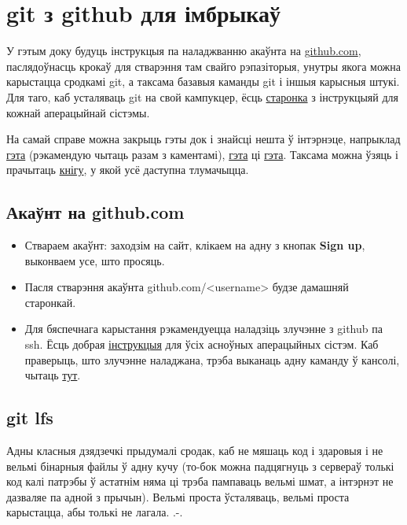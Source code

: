 \documentclass[12pt, a4paper]{extarticle}
\begin{document}
    \section{git з github для імбрыкаў}
    У гэтым доку будуць інструкцыя па наладжванню акаўнта на \href{https://github.com/}{github.com}, паслядоўнасць крокаў для стварэння там свайго рэпазіторыя, унутры якога можна карыстацца сродкамі git, а таксама базавыя каманды git і іншыя карысныя штукі. Для таго, каб усталяваць git на свой кампукцер, ёсць \href{https://git-scm.com/book/en/v2/Getting-Started-Installing-Git}{старонка} з інструкцыяй для кожнай аперацыйнай сістэмы.

    На самай справе можна закрыць гэты док і знайсці нешта ў інтэрнэце, напрыклад \href{https://habr.com/ru/post/125799/}{гэта} (рэкамендую чытаць разам з каментамі), \href{https://www.tutorialspoint.com/git/index.htm}{гэта} ці \href{https://githowto.com}{гэта}. Таксама можна ўзяць і прачытаць \href{https://git-scm.com/book/en/v1/}{кнігу}, у якой усё даступна тлумачыцца.

    \subsection{Акаўнт на github.com}
    \begin{itemize}    
        \item Ствараем акаўнт: заходзім на сайт, клікаем на адну з кнопак \textbf{Sign up}, выконваем усе, што просяць.
        \item Пасля стварэння акаўнта github.com/<username> будзе дамашняй старонкай.
        \item Для бяспечнага карыстання рэкамендуецца наладзіць злучэнне з github па ssh. Ёсць добрая \href{https://help.github.com/en/articles/generating-a-new-ssh-key-and-adding-it-to-the-ssh-agent}{інструкцыя} для ўсіх асноўных аперацыйных сістэм. Каб праверыць, што злучэнне наладжана, трэба выканаць адну каманду ў кансолі, чытаць \href{https://help.github.com/en/articles/testing-your-ssh-connection}{тут}.    
    \end{itemize}

    \subsection{git lfs}
    Адны класныя дзядзечкі прыдумалі сродак, каб не мяшаць код і здаровыя і не вельмі бінарныя файлы ў адну кучу (то-бок можна падцягнуць з сервераў толькі код калі патрэбы ў астатнім няма ці трэба пампаваць вельмі шмат, а інтэрнэт не дазваляе па адной з прычын). Вельмі проста ўсталяваць, вельмі проста карыстацца, абы толькі не лагала. .-.
\end{document}
